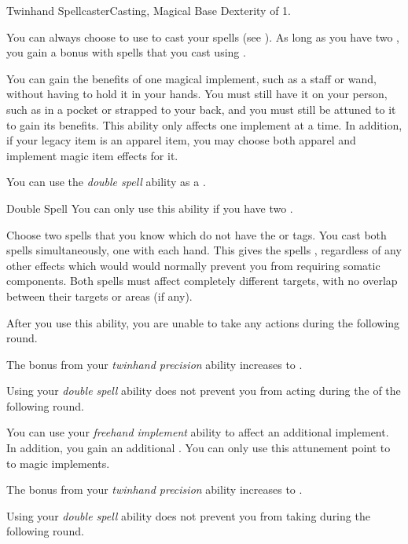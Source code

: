     \begin{feat}{Twinhand Spellcaster}{Casting, Magical}
        \featpre Base Dexterity of 1.

         You can always choose to use  to cast your spells (see ).
        As long as you have two , you gain a   bonus with spells that you cast using .

         You can gain the benefits of one magical implement, such as a staff or wand, without having to hold it in your hands.
        You must still have it on your person, such as in a pocket or strapped to your back, and you must still be attuned to it to gain its benefits.
        This ability only affects one implement at a time.
        In addition, if your legacy item is an apparel item, you may choose both apparel and implement magic item effects for it.

         You can use the \textit{double spell} ability as a .
        \begin{instantability}{Double Spell}
            You can only use this ability if you have two .

            Choose two spells that you know which do not have the  or  tags.
            You cast both spells simultaneously, one with each hand.
            This gives the spells , regardless of any other effects which would would normally prevent you from requiring somatic components.
            Both spells must affect completely different targets, with no overlap between their targets or areas (if any).

            After you use this ability, you are unable to take any actions during the following round.
        \end{instantability}

         The bonus from your \textit{twinhand precision} ability increases to .

         Using your \textit{double spell} ability does not prevent you from acting during the  of the following round.

         You can use your \textit{freehand implement} ability to affect an additional implement.
        In addition, you gain an additional .
        You can only use this attunement point to  to magic implements.

         The bonus from your \textit{twinhand precision} ability increases to .

         Using your \textit{double spell} ability does not prevent you from taking  during the following round.
    \end{feat}

